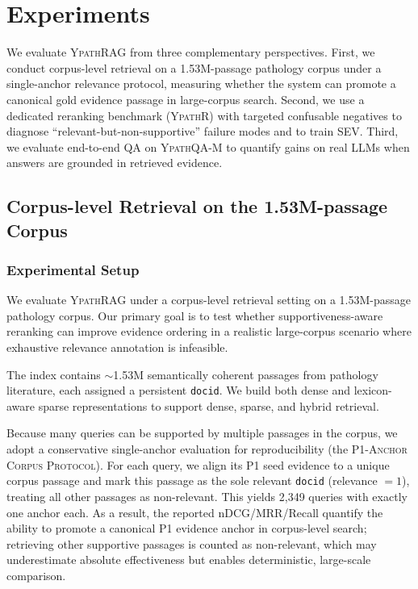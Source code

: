 \documentclass[preprint,12pt,a4paper]{elsarticle}
\newcommand{\method}{\textsc{Ypath\-RAG}}
\begin{document}
\section{Experiments}
\label{sec:experiments}

We evaluate \method{} from three complementary perspectives.
First, we conduct corpus-level retrieval on a 1.53M-passage pathology corpus under a single-anchor relevance protocol, measuring whether the system can promote a canonical gold evidence passage in large-corpus search.
Second, we use a dedicated reranking benchmark (\textsc{YpathR}) with targeted confusable negatives to diagnose ``relevant-but-non-supportive'' failure modes and to train SEV.
Third, we evaluate end-to-end QA on \textsc{YpathQA-M} to quantify gains on real LLMs when answers are grounded in retrieved evidence.

\subsection{Corpus-level Retrieval on the 1.53M-passage Corpus}
\label{subsec:exp_corpus}

\subsubsection{Experimental Setup}
\label{subsubsec:exp_setup}
We evaluate \method{} under a corpus-level retrieval setting on a 1.53M-passage pathology corpus.
Our primary goal is to test whether supportiveness-aware reranking can improve evidence ordering in a realistic large-corpus scenario where exhaustive relevance annotation is infeasible.

The index contains $\sim$1.53M semantically coherent passages from pathology literature, each assigned a persistent \texttt{docid}.
We build both dense and lexicon-aware sparse representations to support dense, sparse, and hybrid retrieval.

Because many queries can be supported by multiple passages in the corpus, we adopt a conservative single-anchor evaluation for reproducibility (the \textsc{P1-Anchor Corpus Protocol}).
For each query, we align its P1 seed evidence to a unique corpus passage and mark this passage as the sole relevant \texttt{docid} (relevance $=1$), treating all other passages as non-relevant.
This yields 2{,}349 queries with exactly one anchor each.
As a result, the reported nDCG/MRR/Recall quantify the ability to promote a canonical P1 evidence anchor in corpus-level search; retrieving other supportive passages is counted as non-relevant, which may underestimate absolute effectiveness but enables deterministic, large-scale comparison.
\end{document}
